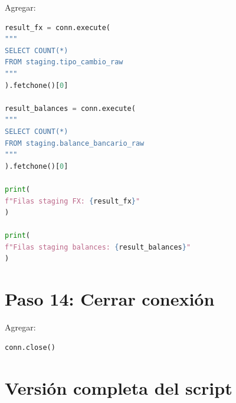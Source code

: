 Agregar:

\begin{lstlisting}[language=Python]
result_fx = conn.execute(
"""
SELECT COUNT(*)
FROM staging.tipo_cambio_raw
"""
).fetchone()[0]

result_balances = conn.execute(
"""
SELECT COUNT(*)
FROM staging.balance_bancario_raw
"""
).fetchone()[0]

print(
f"Filas staging FX: {result_fx}"
)

print(
f"Filas staging balances: {result_balances}"
)
\end{lstlisting}

\section{Paso 14: Cerrar conexión}

Agregar:

\begin{lstlisting}[language=Python]
conn.close()
\end{lstlisting}

\section{Versión completa del script}

